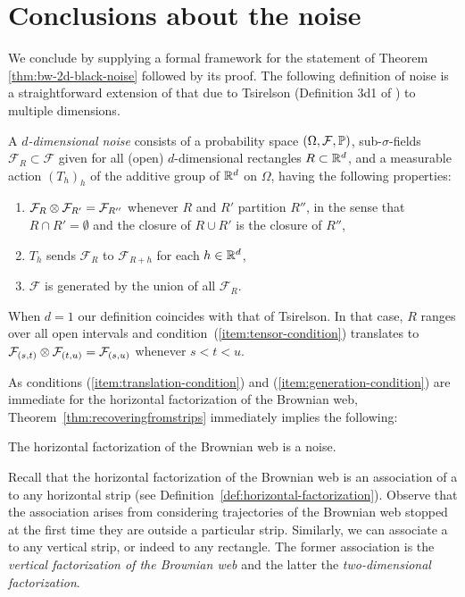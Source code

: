 {
\section{Conclusions about the noise}
\label{sec:conclusions-about-the-noise}

We conclude by supplying a formal framework for the statement of
Theorem \ref{thm:bw-2d-black-noise} followed by its proof.
The following definition of noise is a straightforward extension of
that due to Tsirelson (Definition
3d1 of \cite{tsirelson-nonclassical-stochastic-flows})
to multiple dimensions.

\newcommand{\F}{\mathcal{F}}
A \emph{$d$-dimensional noise} consists of a probability space $(\Omega,\F,
\P)$, sub-$\sigma$-fields $\F_R \subset \F$ given for all (open)
$d$-dimensional rectangles $R \subset \mathbb{R}^d$, and a measurable action
$(T_h)_h$ of the additive group of $\mathbb{R}^d$ on $\Omega$, having the following properties:

\begin{enumerate}
\item \label{item:tensor-condition} $\F_R \tensor \F_{R'} = \F_{R''}$ whenever
$R$ and $R'$ partition $R''$, in the sense that
$R\cap R'=\emptyset$ and the closure of $R \cup R'$
is the closure of $R''$,
\item \label{item:translation-condition} $T_h$ sends $\F_R$ to $\F_{R+h}$ for each $h \in \mathbb{R}^d$,
\item \label{item:generation-condition} $\F$ is generated by the union of all $\F_R$.
\end{enumerate}

When $d = 1$ our definition coincides with that of Tsirelson.
In that case, $R$ ranges over all open intervals
and condition~(\ref{item:tensor-condition}) translates to
$\F_{(s,t)} \tensor \F_{(t,u)} = \F_{(s,u)}$ whenever $s < t < u$.

As conditions (\ref{item:translation-condition}) and
(\ref{item:generation-condition}) are immediate for
the horizontal factorization of the Brownian web,
Theorem~\ref{thm:recoveringfromstrips} immediately
implies the following:

\begin{proposition*}
The horizontal factorization of the Brownian web is a noise.
\end{proposition*}

Recall that the horizontal factorization of the Brownian web is an
association of a \sigfield{} to any horizontal strip (see
Definition~\ref{def:horizontal-factorization}).
Observe that the association arises from considering trajectories of the Brownian
web stopped at the first time they are outside a particular strip.
Similarly, we can associate a \sigfield{} to any vertical strip, or
indeed to any rectangle.  The former association is the \emph{vertical
  factorization of the Brownian web} and the latter the
\emph{two-dimensional factorization}.

}
